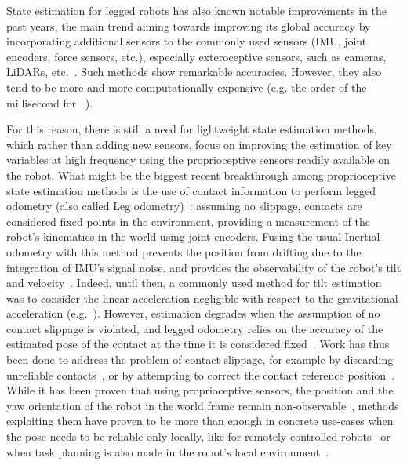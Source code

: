 \documentclass{IJCAS}
\begin{document}
State estimation for legged robots has also known notable improvements in the past years, the main trend aiming towards improving its global accuracy by incorporating additional sensors to the commonly used sensors (IMU, joint encoders, force sensors, etc.), especially exteroceptive sensors, such as cameras, LiDARs, etc.~\cite{wisth2022vilens, fallon2018AccRobLocWalkRobotsImuVisLidar, Kuang2024TightlyCoupledLidarImuUwb}. Such methods show remarkable accuracies. However, they also tend to be more and more computationally expensive (e.g. the order of the millisecond for ~\cite{Kuang2024TightlyCoupledLidarImuUwb}).

For this reason, there is still a need for lightweight state estimation methods, which rather than adding new sensors, focus on improving the estimation of key variables at high frequency using the proprioceptive sensors readily available on the robot. 
What might be the biggest \textquotedbl recent\textquotedbl{} breakthrough among proprioceptive state estimation methods is the use of contact information to perform legged odometry (also called \textquotedbl Leg\textquotedbl{} odometry)~\cite{Lin2005ALegConfigurationMeasSystemHexapod}: assuming no slippage, contacts are considered fixed points in the environment, providing a measurement of the robot's kinematics in the world using joint encoders. Fusing the usual Inertial odometry with this method prevents the position from drifting due to the integration of IMU's signal noise, and provides the observability of the robot's tilt and velocity~\cite{bloesch2013FusionLegKineAndImu, Wawrzynski2015RobustEstVelocityTilt, masuya2015DeadReckoningAnchoringPivot, benallegue2020LyapunovStableOrientationEstimatorHumanoids}. Indeed, until then, a commonly used method for tilt estimation was to consider the linear acceleration negligible with respect to the gravitational acceleration (e.g.~\cite{mahony2008NonlinearComplementaryFiltersOnSO3}). However, estimation degrades when the assumption of no contact slippage is violated, and legged odometry relies on the accuracy of the estimated pose of the contact at the time it is considered fixed~\cite{lin2021legged, maravgakis2023probabilistic}. Work has thus been done to address the problem of contact slippage, for example by discarding unreliable contacts~\cite{lin2021legged, maravgakis2023probabilistic,yoon2023InvariantSmootherDynamicContactEventInformation}, or by attempting to correct the contact reference position~\cite{bloesch2013FusionLegKineAndImu,Hartley2020RIEKF, Demont2024KineticsObserver}. 
While it has been proven that using proprioceptive sensors, the position and the yaw orientation of the robot in the world frame remain non-observable~\cite{bloesch2013FusionLegKineAndImu}, methods exploiting them have proven to be more than enough in concrete use-cases when the pose needs to be reliable only locally, like for remotely controlled robots~\cite{Grandia2024DesignControlBipedalRoboticCharacter} or when task planning is also made in the robot's local environment~\cite{Tsuru2023OnlineMulticontactReplanningHumanoid}.
\end{document}

